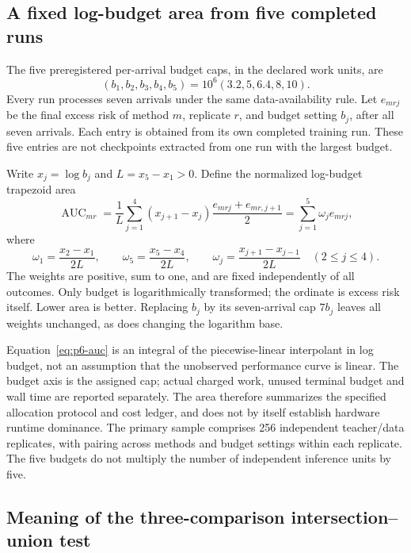 \subsection{A fixed log-budget area from five completed runs}

The five preregistered per-arrival budget caps, in the declared work
units, are
\[
 (b_1,b_2,b_3,b_4,b_5)
 =10^6(3.2,5,6.4,8,10).
\]
Every run processes seven arrivals under the same data-availability
rule. Let $e_{mrj}$ be the final excess risk of method $m$, replicate
$r$, and budget setting $b_j$, after all seven arrivals. Each entry is
obtained from its own completed training run. These five entries are
not checkpoints extracted from one run with the largest budget.

Write $x_j=\log b_j$ and $L=x_5-x_1>0$. Define the normalized
log-budget trapezoid area
\begin{equation}
 \operatorname{AUC}_{mr}
 =\frac1L\sum_{j=1}^{4}(x_{j+1}-x_j)
                   \frac{e_{mrj}+e_{mr,j+1}}2
 =\sum_{j=1}^5\omega_j e_{mrj},
 \label{eq:p6-auc}
\end{equation}
where
\[
 \omega_1=\frac{x_2-x_1}{2L},\qquad
 \omega_5=\frac{x_5-x_4}{2L},\qquad
 \omega_j=\frac{x_{j+1}-x_{j-1}}{2L}\quad(2\le j\le4).
\]
The weights are positive, sum to one, and are fixed independently of
all outcomes. Only budget is logarithmically transformed; the ordinate
is excess risk itself. Lower area is better. Replacing $b_j$ by its
seven-arrival cap $7b_j$ leaves all weights unchanged, as does changing
the logarithm base.

Equation~\eqref{eq:p6-auc} is an integral of the piecewise-linear
interpolant in log budget, not an assumption that the unobserved
performance curve is linear. The budget axis is the assigned cap;
actual charged work, unused terminal budget and wall time are reported
separately. The area therefore summarizes the specified allocation
protocol and cost ledger, and does not by itself establish hardware
runtime dominance. The primary sample comprises 256 independent
teacher/data replicates, with pairing across methods and budget
settings within each replicate. The five budgets do not multiply the
number of independent inference units by five.

\subsection{Meaning of the three-comparison intersection--union test}

